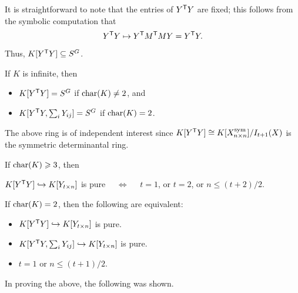 \documentclass[12pt]{article}
\begin{document}
It is straightforward to note that the entries of $Y^{\mathsf{T}} Y$ are fixed; this follows from the symbolic computation that
\begin{equation*} 
	Y^{\mathsf{T}} Y \mapsto Y^{\mathsf{T}} M^{\mathsf{T}} M Y = Y^{\mathsf{T}} Y.
\end{equation*}

Thus, $K[Y^{\mathsf{T}} Y] \subseteq S^{G}$.	

\begin{thm}
	If $K$ is infinite, then 
	\begin{itemize}
		\item $K[Y^{\mathsf{T}} Y] = S^{G}$ if $\operatorname{char}(K) \neq 2$, and
		\item $K[Y^{\mathsf{T}} Y, \sum_{i} Y_{ij}] = S^{G}$ if $\operatorname{char}(K) = 2$.
	\end{itemize}
\end{thm}

The above ring is of independent interest since $K[Y^{\mathsf{T}} Y] \cong K[X_{n \times n}^{\text{sym}}]/I_{t + 1}(X)$ is the symmetric determinantal ring.

\begin{thm}
	If $\operatorname{char}(K) \geqslant 3$, then
	\begin{center} 
		$K[Y^{\mathsf{T}} Y] \hookrightarrow K[Y_{t \times n}]$ is pure $\quad\Leftrightarrow\quad$ $t = 1$, or $t = 2$, or $n \le (t + 2)/2$.
	\end{center}

	If $\operatorname{char}(K) = 2$, then the following are equivalent:
	\begin{itemize}
		\item $K[Y^{\mathsf{T}} Y] \hookrightarrow K[Y_{t \times n}]$ is pure.
		\item $K[Y^{\mathsf{T}} Y, \sum_{i} Y_{ij}] \hookrightarrow K[Y_{t \times n}]$ is pure.
		\item $t = 1$ or $n \le (t + 1)/2$.
	\end{itemize}
\end{thm}

In proving the above, the following was shown.
\end{document}
